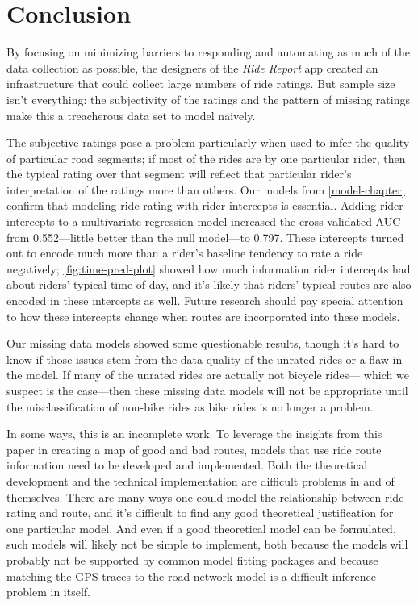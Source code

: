 \documentclass[12pt,twoside]{reedthesis}
\begin{document}
  \chapter*{Conclusion}\label{conclusion}
  
  \setcounter{chapter}{7} \setcounter{section}{0}
  
  By focusing on minimizing barriers to responding and automating as much
  of the data collection as possible, the designers of the \emph{Ride
  Report} app created an infrastructure that could collect large numbers
  of ride ratings. But sample size isn't everything: the subjectivity of
  the ratings and the pattern of missing ratings make this a treacherous
  data set to model naively.
  
  The subjective ratings pose a problem particularly when used to infer
  the quality of particular road segments; if most of the rides are by one
  particular rider, then the typical rating over that segment will reflect
  that particular rider's interpretation of the ratings more than others.
  Our models from \autoref{model-chapter} confirm that modeling ride
  rating with rider intercepts is essential. Adding rider intercepts to a
  multivariate regression model increased the cross-validated AUC from
  0.552---little better than the null model---to 0.797. These intercepts
  turned out to encode much more than a rider's baseline tendency to rate
  a ride negatively; \autoref{fig:time-pred-plot} showed how much
  information rider intercepts had about riders' typical time of day, and
  it's likely that riders' typical routes are also encoded in these
  intercepts as well. Future research should pay special attention to how
  these intercepts change when routes are incorporated into these models.
  
  Our missing data models showed some questionable results, though it's
  hard to know if those issues stem from the data quality of the unrated
  rides or a flaw in the model. If many of the unrated rides are actually
  not bicycle rides--- which we suspect is the case---then these missing
  data models will not be appropriate until the misclassification of
  non-bike rides as bike rides is no longer a problem.
  
  In some ways, this is an incomplete work. To leverage the insights from
  this paper in creating a map of good and bad routes, models that use
  ride route information need to be developed and implemented. Both the
  theoretical development and the technical implementation are difficult
  problems in and of themselves. There are many ways one could model the
  relationship between ride rating and route, and it's difficult to find
  any good theoretical justification for one particular model. And even if
  a good theoretical model can be formulated, such models will likely not
  be simple to implement, both because the models will probably not be
  supported by common model fitting packages and because matching the GPS
  traces to the road network model is a difficult inference problem in
  itself.
  
\end{document}
